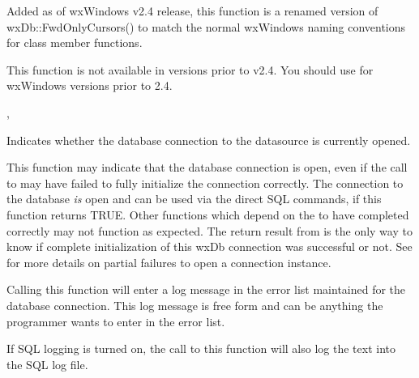 
Added as of wxWindows v2.4 release, this function is a renamed version of 
wxDb::FwdOnlyCursors() to match the normal wxWindows naming conventions for 
class member functions.

This function is not available in versions prior to v2.4.  You should 
use  for wxWindows 
versions prior to 2.4.


, 


\label{wxdbisopen}


Indicates whether the database connection to the datasource is currently 
opened.


This function may indicate that the database connection is open, even if 
the call to  may have failed to fully 
initialize the connection correctly.  The connection to the database 
{\it is} open and can be used via the direct SQL commands, if this 
function returns TRUE.  Other functions which depend on the 
 to have completed correctly may not function 
as expected.  The return result from  is the 
only way to know if complete initialization of this wxDb connection was 
successful or not.  See  for more details on 
partial failures to open a connection instance.


\label{wxdblogerror}




Calling this function will enter a log message in the error list maintained
for the database connection.  This log message is free form and can be
anything the programmer wants to enter in the error list.

If SQL logging is turned on, the call to this function will also log the
text into the SQL log file.

